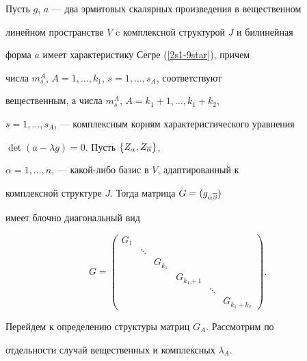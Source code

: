 \begin{lem}


\label{2s1-lm1}


Пусть $g$, $a$ --- два эрмитовых скалярных произведения в вещественном


линейном пространстве $V$ c комплексной структурой $J$ и билинейная


форма $a$ имеет характеристику Сегре {\rom (\ref{2s1-9star})}, причем


числа $m^A_s$, $A=1,\dotsc,k_1$, $s=1,\dotsc,s_A$, соответствуют


вещественным, а числа $m^A_s$, $A=k_1+1,\dotsc,k_1+k_2$,


$s=1,\dotsc,s_A$, --- комплексным корням характеристического уравнения


$\det (a -\lambda g) =0$. Пусть $\{Z_\alpha,Z_{\overline\alpha}\}$,


$\alpha=1,\dotsc,n$, --- какой-либо базис в $V$, адаптированный к


комплексной структуре $J$. Тогда матрица $G=(g_{\alpha\overline\beta})$


имеет блочно диагональный вид


\begin{equation}


\label{eq9}


G=


\begin{pmatrix}


G_1 & & & & & \\


& \ddots & & & & \\


& & G_{k_1} & & & \\


& & & G_{k_1+1} & & \\


& & & & \ddots & \\


& & & & & G_{k_1+k_2}


\end{pmatrix}


.


\end{equation}


\end{lem}





Перейдем к определению структуры матриц $G_A$. Рассмотрим по


отдельности случай вещественных и комплексных $\lambda_A$.





